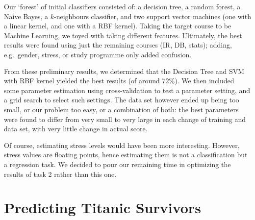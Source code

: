 \documentclass[runningheads,a4paper]{llncs}
\begin{document}
Our `forest' of initial classifiers consisted of: a decision tree, a random 
forest, a Naive Bayes, a $k$-neighbours classifier, and two support vector 
machines (one with a linear kernel, and one with a RBF kernel).  Taking the 
target course to be Machine Learning, we toyed with taking different features.  
Ultimately, the best results were found using just the remaining courses (IR, 
DB, stats); adding, e.g.~gender, stress, or study programme only added 
confusion.

From these preliminary results, we determined that the Decision Tree and SVM 
with RBF kernel yielded the best results (of around 72\%).  We then included 
some parameter estimation using cross-validation to test a parameter setting, 
and a grid search to select such settings.  The data set however ended up 
being too small, or our problem too easy, or a combination of both: the best 
parameters were found to differ from very small to very large in each change 
of training and data set, with very little change in actual score.

Of course, estimating stress levels would have been more interesting.  However, 
stress values are floating points, hence estimating them is not a classification 
but a regression task.  We decided to pour our remaining time in optimizing the 
results of task 2 rather than this one.

\section{Predicting Titanic Survivors}
\end{document}
